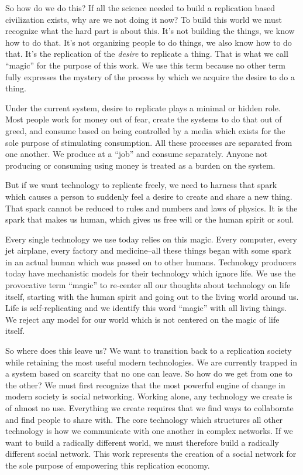 So how do we do this? If all the science needed to build a replication
based civilization exists, why are we not doing it now? To build this
world we must recognize what the hard part is about this. It's not
building the things, we know how to do that. It's not organizing people
to do things, we also know how to do that. It's the replication of the
\emph{desire} to replicate a thing. That is what we call ``magic'' for
the purpose of this work. We use this term because no other term fully
expresses the mystery of the process by which we acquire the desire to
do a thing.

Under the current system, desire to replicate plays a minimal or hidden
role. Most people work for money out of fear, create the systems to do
that out of greed, and consume based on being controlled by a media
which exists for the sole purpose of stimulating consumption. All these
processes are separated from one another. We produce at a ``job'' and
consume separately. Anyone not producing or consuming using money is
treated as a burden on the system.

But if we want technology to replicate freely, we need to harness that
spark which causes a person to suddenly feel a desire to create and
share a new thing. That spark cannot be reduced to rules and numbers and
laws of physics. It is the spark that makes us human, which gives us
free will or the human spirit or soul.

Every single technology we use today relies on this magic. Every
computer, every jet airplane, every factory and medicine--all these
things began with some spark in an actual human which was passed on to
other humans. Technology producers today have mechanistic models for
their technology which ignore life. We use the provocative term
``magic'' to re-center all our thoughts about technology on life itself,
starting with the human spirit and going out to the living world around
us. Life is self-replicating and we identify this word ``magic'' with
all living things. We reject any model for our world which is not
centered on the magic of life itself.

So where does this leave us? We want to transition back to a replication
society while retaining the most useful modern technologies. We are
currently trapped in a system based on scarcity that no one can leave.
So how do we get from one to the other? We must first recognize that the
most powerful engine of change in modern society is social networking.
Working alone, any technology we create is of almost no use. Everything
we create requires that we find ways to collaborate and find people to
share with. The core technology which structures all other technology is
how we communicate with one another in complex networks. If we want to
build a radically different world, we must therefore build a radically
different social network. This work represents the creation of a social
network for the sole purpose of empowering this replication economy.

